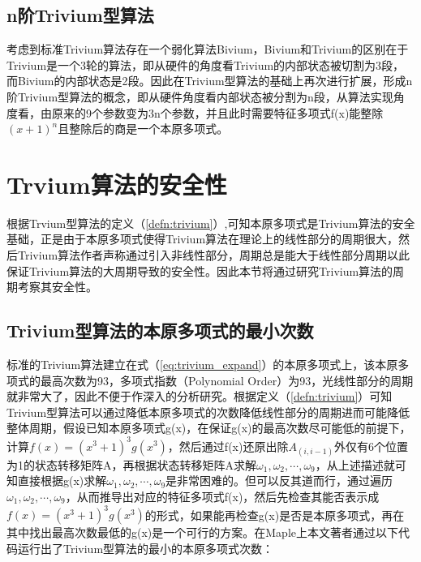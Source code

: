 \subsection{n阶Trivium型算法}

考虑到标准Trivium算法存在一个弱化算法Bivium，Bivium和Trivium的区别在于Trivium是一个3轮的算法，即从硬件的角度看Trivium的内部状态被切割为3段，而Bivium的内部状态是2段。因此在Trivium型算法的基础上再次进行扩展，形成n阶Trivium型算法的概念，即从硬件角度看内部状态被分割为n段，从算法实现角度看，由原来的9个参数变为3n个参数，并且此时需要特征多项式f(x)能整除$(x+1)^{n}$且整除后的商是一个本原多项式。

\section{Trvium算法的安全性}
根据Trvium型算法的定义（\ref{defn:trivium}）,可知本原多项式是Trivium算法的安全基础，正是由于本原多项式使得Trivium算法在理论上的线性部分的周期很大，然后Trivium算法作者声称通过引入非线性部分，周期总是能大于线性部分周期以此保证Trivium算法的大周期导致的安全性。因此本节将通过研究Trivium算法的周期考察其安全性。

\subsection{Trivium型算法的本原多项式的最小次数}
标准的Trivium算法建立在式（\ref{eq:trivium_expand}）的本原多项式上，该本原多项式的最高次数为93，多项式指数（Polynomial Order）为93，光线性部分的周期就非常大了，因此不便于作深入的分析研究。根据定义（\ref{defn:trivium}）可知Trivium型算法可以通过降低本原多项式的次数降低线性部分的周期进而可能降低整体周期，假设已知本原多项式g(x)，在保证g(x)的最高次数尽可能低的前提下，计算$f(x)=(x^{3}+1)^{3}g(x^{3})$，然后通过f(x)还原出除$A_{(i,i-1)}$外仅有6个位置为1的状态转移矩阵A，再根据状态转移矩阵A求解$\omega_{1},\omega_{2},\cdots,\omega_{9}$，从上述描述就可知直接根据g(x)求解$\omega_{1},\omega_{2},\cdots,\omega_{9}$是非常困难的。但可以反其道而行，通过遍历$\omega_{1},\omega_{2},\cdots,\omega_{9}$，从而推导出对应的特征多项式f(x)，然后先检查其能否表示成$f(x)=(x^{3}+1)^{3}g(x^{3})$的形式，如果能再检查g(x)是否是本原多项式，再在其中找出最高次数最低的g(x)是一个可行的方案。在Maple上本文著者通过以下代码运行出了Trivium型算法的最小的本原多项式次数：

